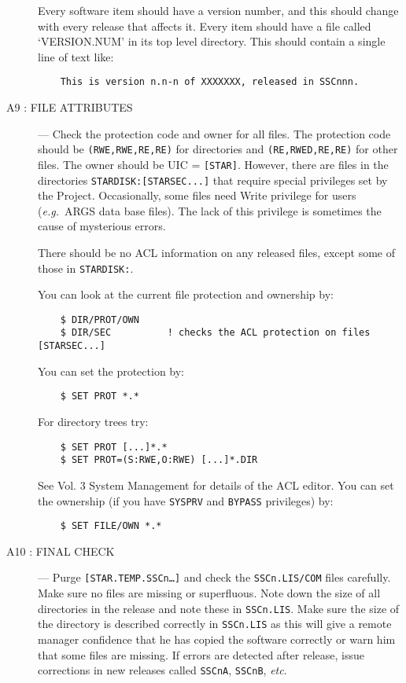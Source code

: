 \begin{description}
Every software item should have a version number, and this should change with
every release that affects it.
Every item should have a file called `VERSION.NUM' in its top level directory.
This should contain a single line of text like:
\begin{verbatim}
    This is version n.n-n of XXXXXXX, released in SSCnnn.
\end{verbatim}

\item [A9 : FILE ATTRIBUTES] ---
Check the protection code and owner for all files.
The protection code should be {\tt (RWE,RWE,RE,RE)} for directories and 
{\tt (RE,RWED,RE,RE)} for other files.
The owner should be UIC = {\tt [STAR]}.
However, there are files in the directories {\tt STARDISK:[STARSEC...]} that
require special privileges set by the Project.
Occasionally, some files need Write privilege for users ({\em e.g.}\ ARGS
data base files).
The lack of this privilege is sometimes the cause of mysterious errors.

There should be no ACL information on any released files, except some of those
in {\tt STARDISK:\-[STARSEC...]}.

You can look at the current file protection and ownership by:
\begin{verbatim}
    $ DIR/PROT/OWN
    $ DIR/SEC          ! checks the ACL protection on files [STARSEC...]
\end{verbatim}
You can set the protection by:
\begin{verbatim}
    $ SET PROT *.*
\end{verbatim}
For directory trees try:
\begin{verbatim}
    $ SET PROT [...]*.*
    $ SET PROT=(S:RWE,O:RWE) [...]*.DIR
\end{verbatim}
See Vol. 3 System Management for details of the ACL editor.
You can set the ownership (if you have {\tt SYSPRV} and {\tt BYPASS} 
privileges) by:
\begin{verbatim}
    $ SET FILE/OWN *.*
\end{verbatim}

\item [A10 : FINAL CHECK] ---
Purge {\tt [STAR.TEMP.SSCn\ldots]} and check the {\tt SSCn.LIS/COM} files 
carefully. Make sure no files are missing or superfluous.
Note down the size of all directories in the release and note these in
{\tt SSCn.LIS}.
Make sure the size of the directory is described correctly in {\tt SSCn.LIS} 
as this will give a remote manager confidence that he has copied the software 
correctly or warn him that some files are missing.
If errors are detected after release, issue corrections in new releases called
{\tt SSCnA}, {\tt SSCnB}, {\em etc}.
\end{description}

